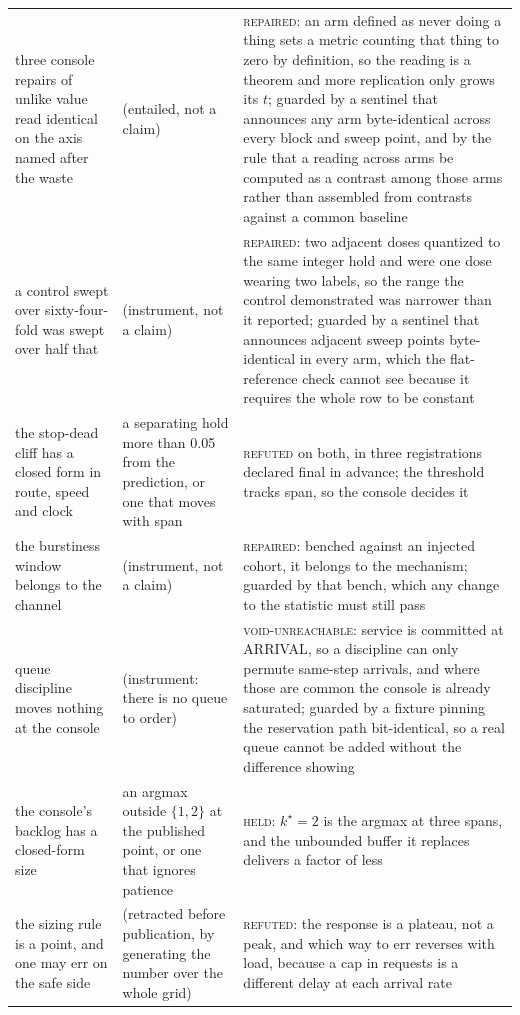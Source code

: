 \begin{tabular}{@{}p{}p{}p{}@{}}
three console repairs of unlike value read identical on the axis named after the waste & (entailed, not a claim) & \textsc{repaired}: an arm defined as never doing a thing sets a metric counting that thing to zero by definition, so the reading is a theorem and more replication only grows its $t$; guarded by a sentinel that announces any arm byte-identical across every block and sweep point, and by the rule that a reading across arms be computed as a contrast among those arms rather than assembled from contrasts against a common baseline \\
a control swept over sixty-four-fold was swept over half that & (instrument, not a claim) & \textsc{repaired}: two adjacent doses quantized to the same integer hold and were one dose wearing two labels, so the range the control demonstrated was narrower than it reported; guarded by a sentinel that announces adjacent sweep points byte-identical in every arm, which the flat-reference check cannot see because it requires the whole row to be constant \\
the stop-dead cliff has a closed form in route, speed and clock & a separating hold more than 0.05 from the prediction, or one that moves with span & \textsc{refuted} on both, in three registrations declared final in advance; the threshold tracks span, so the console decides it \\
the burstiness window belongs to the channel & (instrument, not a claim) & \textsc{repaired}: benched against an injected cohort, it belongs to the mechanism; guarded by that bench, which any change to the statistic must still pass \\
queue discipline moves nothing at the console & (instrument: there is no queue to order) & \textsc{void-unreachable}: service is committed at ARRIVAL, so a discipline can only permute same-step arrivals, and where those are common the console is already saturated; guarded by a fixture pinning the reservation path bit-identical, so a real queue cannot be added without the difference showing \\
the console's backlog has a closed-form size & an argmax outside $\{1,2\}$ at the published point, or one that ignores patience & \textsc{held}: $k^{\star}=2$ is the argmax at three spans, and the unbounded buffer it replaces delivers a factor of \QcapUnboundedGainMed{} less \\
the sizing rule is a point, and one may err on the safe side & (retracted before publication, by generating the number over the whole grid) & \textsc{refuted}: the response is a plateau, not a peak, and which way to err reverses with load, because a cap in requests is a different delay at each arrival rate \\

\end{tabular}
